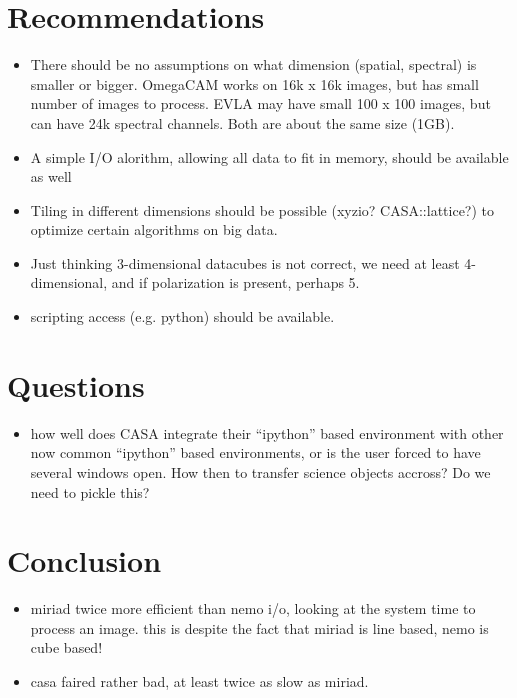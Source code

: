 \documentclass[preprint]{aastex} %
\begin{document}
\section{Recommendations}

\begin{itemize}

\item There should be no assumptions on what dimension (spatial, spectral)
is smaller or bigger. OmegaCAM works on 16k x 16k images, but has small
number of images to process.  EVLA may have small 100 x 100 images, but
can have 24k spectral channels. Both are about the same size (1GB).

\item A simple I/O alorithm, allowing all data to fit in memory, should
be available as well

\item Tiling in different dimensions should 
be possible (xyzio? CASA::lattice?) to optimize certain algorithms 
on big data.

\item Just thinking 3-dimensional datacubes is not correct, we need at least
4-dimensional, and if polarization is present, perhaps 5.

\item scripting access (e.g. python) should be available.

\end{itemize}

\section{Questions}
\begin{itemize}
\item how well does CASA integrate their ``ipython'' based environment
with other now common ``ipython'' based environments, or is the user
forced to have several windows open. How then to transfer science objects
accross? Do we need to pickle this?

\end{itemize}

\section{Conclusion}

\begin{itemize}

\item miriad twice more efficient than nemo i/o, looking at the system time
  to process an image. this is despite the fact that miriad is line based,
  nemo is cube based!
\item casa faired rather bad, at least twice as slow as miriad.

\end{itemize}
\end{document}
